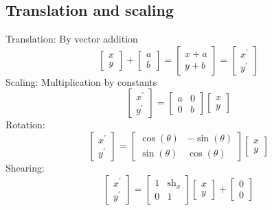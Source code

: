 \documentclass{article}[18pt]
\begin{document}
\subsection{Translation and scaling}
Translation: By vector addition
$$
\left[\begin{array}{l}{x} \\ {y}\end{array}\right]+\left[\begin{array}{l}{a} \\ {b}\end{array}\right]=\left[\begin{array}{l}{x+a} \\ {y+b}\end{array}\right]=\left[\begin{array}{l}{x^{'}} \\ {y^{\prime}}\end{array}\right]
$$
Scaling: Multiplication by constants
$$
\left[\begin{array}{l}{x^{\prime}} \\ {y^{\prime}}\end{array}\right]=\left[\begin{array}{ll}{a} & {0} \\ {0} & {b}\end{array}\right]\left[\begin{array}{l}{x} \\ {y}\end{array}\right]
$$
Rotation:
$$
\left[\begin{array}{l}{x^{\prime}} \\ {y^{\prime}}\end{array}\right]=\left[\begin{array}{cc}{\cos (\theta)} & {-\sin (\theta)} \\ {\sin (\theta)} & {\cos (\theta)}\end{array}\right]\left[\begin{array}{l}{x} \\ {y}\end{array}\right]
$$
Shearing:
$$
\left[\begin{array}{c}{x^{\prime}} \\ {y^{\prime}}\end{array}\right]=\left[\begin{array}{cc}{1} & {\operatorname{sh}_{x}} \\ {0} & {1}\end{array}\right]\left[\begin{array}{l}{x} \\ {y}\end{array}\right]+\left[\begin{array}{l}{0} \\ {0}\end{array}\right]
$$
\end{document}
